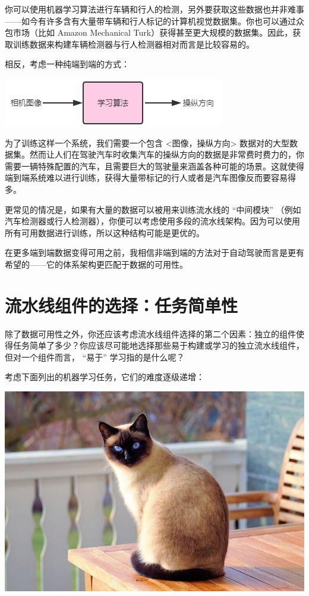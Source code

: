 你可以使用机器学习算法进行车辆和行人的检测，另外要获取这些数据也并非难事------如今有许多含有大量带车辆和行人标记的计算机视觉数据集。你也可以通过众包市场（比如
Amazon Mechanical
Turk）获得甚至更大规模的数据集。因此，获取训练数据来构建车辆检测器与行人检测器相对而言是比较容易的。

相反，考虑一种纯端到端的方式：

\includegraphics{./img/ch48_04.png}

为了训练这样一个系统，我们需要一个包含
\textless 图像，操纵方向\textgreater{}
数据对的大型数据集。然而让人们在驾驶汽车时收集汽车的操纵方向的数据是非常费时费力的，你需要一辆特殊配置的汽车，且需要巨大的驾驶量来涵盖各种可能的场景。这就使得端到端系统难以进行训练，获得大量带标记的行人或者是汽车图像反而要容易得多。

更常见的情况是，如果有大量的数据可以被用来训练流水线的 ``中间模块''
（例如汽车检测器或行人检测器），你便可以考虑使用多段的流水线架构。因为可以使用所有可用数据进行训练，所以这种结构可能是更优的。

在更多端到端数据变得可用之前，我相信非端到端的方法对于自动驾驶而言是更有希望的------它的体系架构更匹配于数据的可用性。

\hypertarget{ux6d41ux6c34ux7ebfux7ec4ux4ef6ux7684ux9009ux62e9ux4efbux52a1ux7b80ux5355ux6027}{%
\chapter{流水线组件的选择：任务简单性}\label{ux6d41ux6c34ux7ebfux7ec4ux4ef6ux7684ux9009ux62e9ux4efbux52a1ux7b80ux5355ux6027}}

除了数据可用性之外，你还应该考虑流水线组件选择的第二个因素：独立的组件使得任务简单了多少？你应该尽可能地选择那些易于构建或学习的独立流水线组件，但对一个组件而言，
``易于'' 学习指的是什么呢？

考虑下面列出的机器学习任务，它们的难度逐级递增：

\includegraphics{./img/ch51_01.png}

